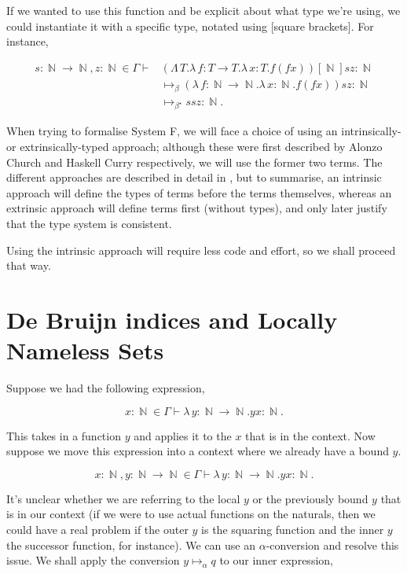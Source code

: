 \documentclass[logo,bsc,singlespacing,parskip,online]{infthesis}
\DeclareMathOperator{\nat}{\mathbb{N}}
\begin{document}
If we wanted to use this function and be explicit about what type we're using, we could instantiate
it with a specific type, notated using [square brackets]. For instance,

\begin{align*}
  s \colon \nat \to \nat, z \colon \nat \in \Gamma \vdash &(\Lambda \, T. \lambda \, f \colon T \to T . \lambda \, x \colon T . f (f x))[\nat] s z \colon \nat\\
  &\mapsto_{\beta} (\lambda \, f \colon \nat \to \nat . \lambda \, x \colon \nat . f (f x)) s z \colon \nat\\
  &\mapsto_{\beta^{\star}} s s z \colon \nat.
\end{align*}

When trying to formalise System F, we will face a choice of using an
intrinsically- or extrinsically-typed approach; although these were first
described by Alonzo Church and Haskell Curry respectively, we will use the
former two terms. The different approaches are described in detail in
\citet{gries_what_2003}, but to summarise, an intrinsic approach will define the
types of terms before the terms themselves, whereas an extrinsic approach will
define terms first (without types), and only later justify that the type system
is consistent.

Using the intrinsic approach will require less code and effort, so we shall
proceed that way.

\section{De Bruijn indices and Locally Nameless Sets}

Suppose we had the following expression,

\begin{equation*}
  x \colon \nat \in \Gamma \vdash \lambda \, y \colon \nat \to \nat. y x \colon \nat.
\end{equation*}

This takes in a function $y$ and applies it to the $x$ that is in the context.
Now suppose we move this expression into a context where we already have a bound
$y$.

\begin{equation*}
  x \colon \nat, y \colon \nat \to \nat \in \Gamma \vdash \lambda \, y \colon \nat \to \nat. y x \colon \nat.
\end{equation*}

It's unclear whether we are referring to the local $y$ or the previously bound
$y$ that is in our context (if we were to use actual functions on the naturals,
then we could have a real problem if the outer $y$ is the squaring function and
the inner $y$ the successor function, for instance). We can use an
$\alpha$-conversion and resolve this issue. We shall apply the conversion $y
\mapsto_{\alpha} q$ to our inner expression,
\end{document}
